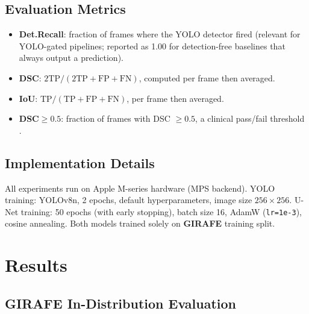 \documentclass[preprint,12pt]{elsarticle}
\newcommand{\girafe}{\textbf{GIRAFE}}
\begin{document}
\subsection{Evaluation Metrics}
\label{sec:metrics}

\begin{itemize}
  \item \textbf{Det.Recall}: fraction of frames where the YOLO detector fired
    (relevant for YOLO-gated pipelines; reported as \num{1.00} for detection-free
    baselines that always output a prediction).
  \item \textbf{DSC}: \(2\mathrm{TP}/(2\mathrm{TP}+\mathrm{FP}+\mathrm{FN})\),
    computed per frame then averaged.
  \item \textbf{IoU}: \(\mathrm{TP}/(\mathrm{TP}+\mathrm{FP}+\mathrm{FN})\),
    per frame then averaged.
  \item \textbf{DSC${\geq}0.5$}: fraction of frames with DSC $\geq 0.5$,
    a clinical pass/fail threshold \cite{andrade2025datainbrief}.
\end{itemize}

\subsection{Implementation Details}
All experiments run on Apple M-series hardware (MPS backend).
YOLO training: YOLOv8n, \num{2} epochs, default hyperparameters, image size
\(256\times256\).
U-Net training: \num{50} epochs (with early stopping), batch size \num{16}, AdamW (\texttt{lr=1e-3}),
cosine annealing.
Both models trained solely on \girafe{} training split.

\section{Results}
\label{sec:results}

\subsection{GIRAFE In-Distribution Evaluation}
\label{sec:results_girafe}
\end{document}
